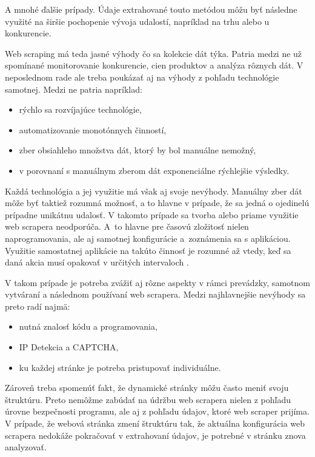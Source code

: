 A mnohé ďalšie prípady. Údaje extrahované touto metódou môžu byť následne využité na širšie pochopenie vývoja udalostí, napríklad na trhu alebo u konkurencie.

Web scraping má teda jasné výhody čo sa kolekcie dát týka. Patria medzi ne už spomínané monitorovanie konkurencie, cien produktov a analýza rôznych dát. V neposlednom rade ale treba poukázať aj na výhody z pohľadu technológie samotnej. Medzi ne patria napríklad:

\begin{itemize}
    \item rýchlo sa rozvíjajúce technológie,
    \item automatizovanie monotónnych činností,
    \item zber obsiahleho množstva dát, ktorý by bol manuálne nemožný,
    \item v porovnaní s manuálnym zberom dát exponenciálne rýchlejšie výsledky.
\end{itemize}

Každá technológia a jej využitie má však aj svoje nevýhody. Manuálny zber dát môže byť taktiež rozumná možnosť, a to hlavne v prípade, že sa jedná o ojedinelú prípadne unikátnu udalosť. V takomto prípade sa tvorba alebo priame využitie web scrapera neodporúča. A~to hlavne pre časovú zložitosť nielen naprogramovania, ale aj samotnej konfigurácie a~zoznámenia sa s aplikáciou. Využitie samostatnej aplikácie na takúto činnosť je rozumné až vtedy, keď sa daná akcia musí opakovať v určitých intervaloch \cite{WebScrap}. 

V takom prípade je potreba zvážiť aj rôzne aspekty v rámci prevádzky, samotnom vytváraní a následnom používaní web scrapera. Medzi najhlavnejšie nevýhody sa preto radí najmä:

\begin{itemize}
    \item nutná znalosť kódu a programovania,
    \item IP Detekcia a CAPTCHA,
    \item ku každej stránke je potreba pristupovať individuálne.
\end{itemize}

Zároveň treba spomenúť fakt, že dynamické stránky môžu často meniť svoju štruktúru. Preto nemôžme zabúdať na údržbu web scrapera nielen z pohľadu úrovne bezpečnosti programu, ale aj z pohľadu údajov, ktoré web scraper prijíma. V prípade, že webová stránka zmení štruktúru tak, že aktuálna konfigurácia web scrapera nedokáže pokračovať v extrahovaní údajov, je potrebné v stránku znova analyzovať. 

